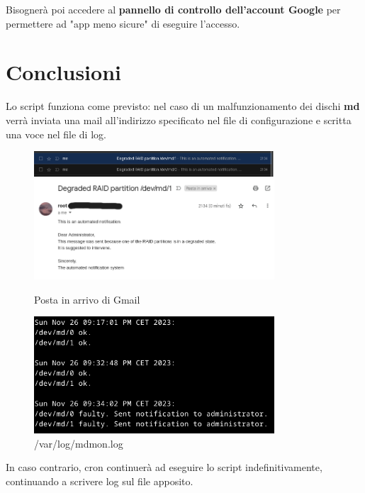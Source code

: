 \documentclass[11pt]{article}
\begin{document}
Bisognerà poi accedere al \textbf{pannello di controllo dell'account Google} per permettere ad "app meno sicure" di eseguire l'accesso.

\pagebreak

\section{Conclusioni}
Lo script funziona come previsto: nel caso di un malfunzionamento dei dischi \textbf{md} verrà inviata una mail all'indirizzo specificato nel file di configurazione e scritta una voce nel file di log.
\begin{figure}[H]
    \includegraphics[width=0.8\textwidth, keepaspectratio]{../img/inbox.png}
    \centering

    \includegraphics[width=0.8\textwidth, keepaspectratio]{../img/mail.png}
    \centering
    \caption{Posta in arrivo di Gmail}

    \includegraphics[width=0.8\textwidth, keepaspectratio]{../img/log.png}
    \centering
    \caption{/var/log/mdmon.log}
\end{figure}
In caso contrario, cron continuerà ad eseguire lo script indefinitivamente, continuando a scrivere log sul file apposito.
\end{document}
